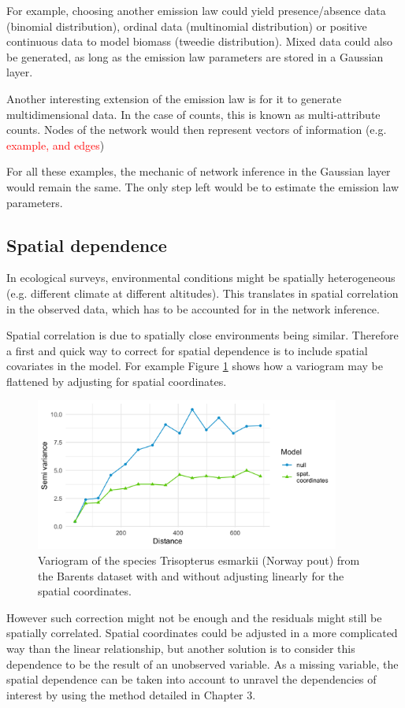 For example, choosing another emission law could yield presence/absence data (binomial distribution), ordinal data (multinomial distribution) or positive continuous data to model biomass (tweedie distribution). Mixed data could also be generated, as long as the emission law parameters are stored in a Gaussian layer. 

Another interesting extension of the emission law is for it to generate multidimensional data.  In the case of counts, this is known as multi-attribute counts. Nodes of the network would then represent vectors of information (e.g. \textcolor{red}{example, and edges})

For all these examples, the mechanic of network inference in the Gaussian layer would remain the same. The only step left would be to estimate the emission law parameters.


\subsection{Spatial dependence}
In ecological surveys, environmental conditions might be spatially heterogeneous (e.g. different climate at different altitudes).   This translates in spatial correlation in the observed data, which has to be accounted for in the network inference.

Spatial correlation is due to spatially close environments being similar. Therefore a first and quick way to correct for spatial dependence is to include spatial covariates in the model. For example Figure \ref{vario} shows how a variogram may be flattened by adjusting for spatial coordinates.
\begin{figure}
\centering
\includegraphics[width=10cm]{figs/variogram.png}
\caption{Variogram of the species Trisopterus esmarkii (Norway pout) from the Barents dataset with and without adjusting linearly for the spatial coordinates.}
\label{vario}
\end{figure}
However such correction might not be enough and the residuals might still be spatially correlated. Spatial coordinates could be adjusted in a more complicated way than the linear relationship, but another solution is to consider this dependence to be the result of an unobserved variable. As a missing variable, the spatial dependence can be taken into account to unravel the dependencies of interest by using the method detailed in Chapter 3.

